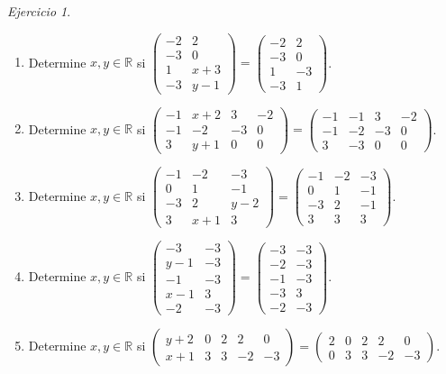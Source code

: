 \documentclass[12pt]{article}
\theoremstyle{remark}
\newtheorem{Ejer}[definicion]{Ejercicio}
\begin{document}
\begin{Ejer}
\begin{enumerate}[resume=banco]
\item Determine $x,y\in\mathbb R$ si $\begin{pmatrix}-2&2\\-3&0\\1&x + 3\\-3&y - 1\end{pmatrix}=\begin{pmatrix}-2&2\\-3&0\\1&-3\\-3&1\end{pmatrix}$.

\item Determine $x,y\in\mathbb R$ si $\begin{pmatrix}-1&x + 2&3&-2\\-1&-2&-3&0\\3&y + 1&0&0\end{pmatrix}=\begin{pmatrix}-1&-1&3&-2\\-1&-2&-3&0\\3&-3&0&0\end{pmatrix}$.

\item Determine $x,y\in\mathbb R$ si $\begin{pmatrix}-1&-2&-3\\0&1&-1\\-3&2&y - 2\\3&x + 1&3\end{pmatrix}=\begin{pmatrix}-1&-2&-3\\0&1&-1\\-3&2&-1\\3&3&3\end{pmatrix}$.

\item Determine $x,y\in\mathbb R$ si $\begin{pmatrix}-3&-3\\y - 1&-3\\-1&-3\\x - 1&3\\-2&-3\end{pmatrix}=\begin{pmatrix}-3&-3\\-2&-3\\-1&-3\\-3&3\\-2&-3\end{pmatrix}$.

\item Determine $x,y\in\mathbb R$ si $\begin{pmatrix}y + 2&0&2&2&0\\x + 1&3&3&-2&-3\end{pmatrix}=\begin{pmatrix}2&0&2&2&0\\0&3&3&-2&-3\end{pmatrix}$.


\end{enumerate}
\end{Ejer}
\end{document}
